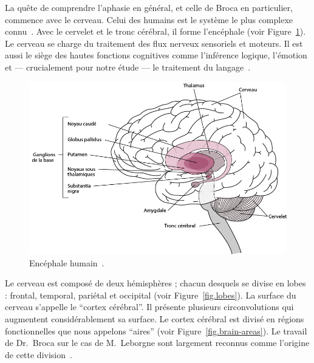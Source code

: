 
La quête de comprendre l'aphasie en général, et celle de Broca en particulier, commence avec le cerveau.
Celui des humains est le système le plus complexe connu~\cite{Sciences_Medicine_Ackerman_1992}.
Avec le cervelet et le tronc cérébral, il forme l'encéphale (voir Figure~\ref{fig.brain}).
Le cerveau se charge du traitement des flux nerveux sensoriels et moteurs.
Il est aussi le siège des hautes fonctions cognitives comme l'inférence logique, l'émotion 
et --- crucialement pour notre étude --- le traitement du langage~\cite{Fodor_1983}.

\begin{figure}[htb]
    \begin{center}
        \includegraphics[width=.8\textwidth]{assets/images/brain.png}
    \end{center}
    \caption[Encéphale humain.]
    {Encéphale humain~\cite{Figure}.}
    \label{fig.brain}
\end{figure}

Le cerveau est composé de deux hémisphères ; chacun desquels se divise en lobes : 
frontal, temporal, pariétal et occipital (voir Figure~\ref{fig.lobes}).
La surface du cerveau s'appelle le ``cortex cérébral''.
Il présente plusieurs circonvolutions qui augmentent considérablement sa surface.
Le cortex cérébral est divisé en régions fonctionnelles que nous appelons ``aires''
(voir Figure~\ref{fig.brain-areas}).
Le travail de Dr.~Broca sur le cas de M.~Leborgne sont largement reconnus 
comme l'origine de cette division~\cite{Fodor_1983}.

